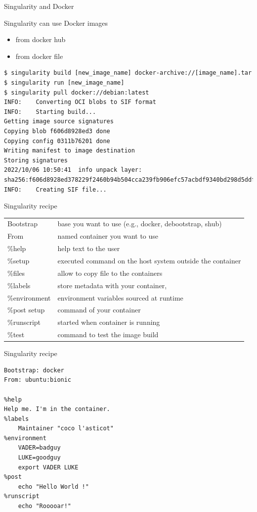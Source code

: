 \begin{frame}[fragile]{Singularity and Docker}
\begin{block}{Singularity can use Docker images}
\begin{itemize}
\item from docker hub
\item from docker file
\end{itemize}
\end{block}
\begin{verbatim}
$ singularity build [new_image_name] docker-archive://[image_name].tar
$ singularity run [new_image_name]
$ singularity pull docker://debian:latest
INFO:    Converting OCI blobs to SIF format
INFO:    Starting build...
Getting image source signatures
Copying blob f606d8928ed3 done  
Copying config 0311b76201 done  
Writing manifest to image destination
Storing signatures
2022/10/06 10:50:41  info unpack layer: sha256:f606d8928ed378229f2460b94b504cca239fb906efc57acbdf9340bd298d5ddf
INFO:    Creating SIF file...
\end{verbatim}
\end{frame}

\begin{frame}{Singularity recipe}
\begin{tabular}{ll}
Bootstrap &  base you want to use (e.g., docker, debootstrap, shub) \\
From &  named container you want to use \\
\%help & help text to the user\\
\%setup & executed command on the host system outside the container\\
\%files & allow to copy file to the containers \\
\%labels & store metadata with your container, \\
\%environment & environment variables sourced at runtime \\
\%post setup & command of your container \\
\%runscript & started when container is running \\
\%test & command to test the image build \\
\end{tabular}
\end{frame}

\begin{frame}[fragile]{Singularity recipe}
\begin{verbatim}
Bootstrap: docker
From: ubuntu:bionic

%help
Help me. I'm in the container.
%labels
    Maintainer "coco l'asticot"
%environment
    VADER=badguy
    LUKE=goodguy
    export VADER LUKE
%post
    echo "Hello World !"
%runscript
    echo "Rooooar!"
\end{verbatim}
\end{frame}
